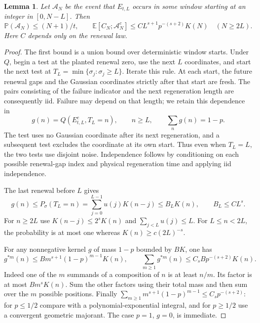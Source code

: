 \documentclass[11pt]{article}
\newtheorem{lemma}[lemma]{Lemma}
\theoremstyle{remark}
\numberwithin{equation}{section}
\newcommand{\E}{\mathbb E}
\newcommand{\Penv}{\mathbb P}
\begin{document}
\begin{lemma}\label{lem:failed-tests}
Let $\mathcal A_N$ be the event that $E_{t,L}$ occurs in some window
starting at an integer in $[0,N-L]$. Then
\begin{equation}\label{eq:failed-tests}
 \Penv(\mathcal A_N)\le(N+1)/t,\qquad
 \E[C_N;\mathcal A_N^c]\le C L^{s+1}p^{-(s+2)}K(N)
 \quad(N\ge2L).
\end{equation}
Here $C$ depends only on the renewal law.
\end{lemma}
\begin{proof}
The first bound is a union bound over deterministic window starts.
Under $Q$, begin a test at the planted renewal zero, use the next $L$
coordinates, and start the next test at
$T_L=\min\{\sigma_j:\sigma_j\ge L\}$. Iterate this rule.
At each start, the future renewal gaps and the Gaussian coordinates strictly
after that start are fresh. The pairs consisting of the failure indicator
and the next regeneration length are consequently iid. Failure may depend
on that length; we retain this dependence in
\[
 g(n)=Q(E_{t,L}^c,T_L=n),\qquad n\ge L,\qquad
 \sum_n g(n)=1-p.
\]
The test uses no Gaussian coordinate after its next regeneration, and a
subsequent test excludes the coordinate at its own start. Thus even when
$T_L=L$, the two tests use disjoint noise. Independence follows by
conditioning on each possible renewal-gap index and physical regeneration
time and applying iid independence.

The last renewal before $L$ gives
\begin{equation}\label{eq:g-envelope}
 g(n)\le P_\sigma(T_L=n)
   =\sum_{j=0}^{L-1}u(j)K(n-j)\le B_LK(n),
 \qquad B_L\le C L^s.
\end{equation}
For $n\ge2L$ use $K(n-j)\le2^sK(n)$ and $\sum_{j<L}u(j)\le L$.
For $L\le n<2L$, the probability is at most one whereas
$K(n)\ge c(2L)^{-s}$.

For any nonnegative kernel $g$ of mass $1-p$ bounded by $BK$, one has
\begin{equation}\label{eq:defective-convolution}
 g^{*m}(n)\le Bm^{s+1}(1-p)^{m-1}K(n),\qquad
 \sum_{m\ge1}g^{*m}(n)\le C_s Bp^{-(s+2)}K(n).
\end{equation}
Indeed one of the $m$ summands of a composition of $n$ is at least $n/m$.
Its factor is at most $Bm^sK(n)$. Sum the other factors using their total
mass and then sum over the $m$ possible positions. Finally
$\sum_{m\ge1}m^{s+1}(1-p)^{m-1}\le C_s p^{-(s+2)}$:
for $p\le1/2$ compare with a polynomial-exponential integral, and for
$p\ge1/2$ use a convergent geometric majorant. The case $p=1$, $g=0$,
is immediate.


\end{proof}
\end{document}
